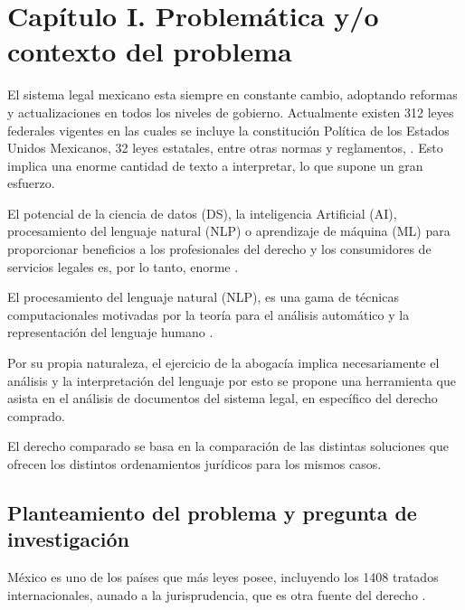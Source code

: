 \documentclass[12pt]{article}
\begin{document}
	
	
	\section{Capítulo I. Problemática y/o contexto del problema}
	\label{section:problemática}
			
		
		
		El sistema legal mexicano esta siempre en constante cambio, adoptando reformas y actualizaciones en todos los niveles de gobierno. Actualmente existen 312 leyes federales vigentes en las cuales se incluye la constitución Política de los Estados Unidos Mexicanos, 32 leyes estatales, entre otras normas y reglamentos, \cite{Parlamentarios2020}. Esto implica una enorme cantidad de texto a interpretar, lo que supone un gran esfuerzo.
		
		El potencial de la ciencia de datos (DS), la inteligencia Artificial (AI), procesamiento del lenguaje natural (NLP) o aprendizaje de máquina (ML) para proporcionar beneficios a los profesionales del derecho y los consumidores de servicios legales es, por lo tanto, enorme \cite{Aletras2020}.
	
		El procesamiento del lenguaje natural (NLP),  es una gama de técnicas computacionales motivadas por la teoría para el análisis automático y la representación del lenguaje humano \cite{Cambria2014}. 	
		
		Por su propia naturaleza, el ejercicio de la abogacía implica necesariamente el análisis y la interpretación del lenguaje \cite{Romero-Perez2014} por esto se propone una herramienta que asista en el análisis de documentos del sistema legal, en específico del derecho comprado.

		El derecho comparado se basa en la comparación de las distintas soluciones que ofrecen los distintos ordenamientos jurídicos para los mismos casos.\cite{Somma2006}
		
		
		
		\subsection{Planteamiento del problema y pregunta de investigación}
		México es uno de los países que más leyes posee, incluyendo los 1408 tratados internacionales, aunado a la jurisprudencia, que es otra fuente del derecho \cite{GUERRA2016}.
		
\end{document}
